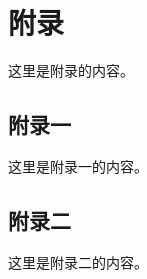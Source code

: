 \section{附录}

这里是附录的内容。

\page
\subsection{附录一}

这里是附录一的内容。

\page
\subsection{附录二}

这里是附录二的内容。

\page